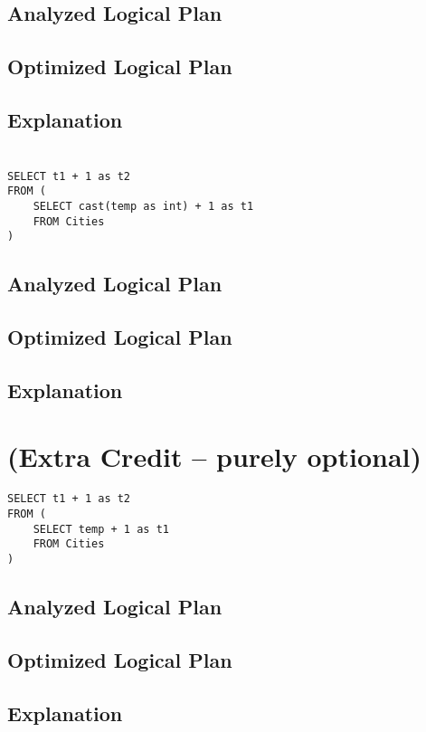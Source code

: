 \documentclass[12pt]{article}
\begin{document}
\subsection*{Analyzed Logical Plan}
\vspace{2in}

\subsection*{Optimized Logical Plan}
\vspace{2in}

\subsection*{Explanation}

\newpage

\section{}
\begin{verbatim}
SELECT t1 + 1 as t2
FROM (
    SELECT cast(temp as int) + 1 as t1
    FROM Cities
)
\end{verbatim}

\subsection*{Analyzed Logical Plan}
\vspace{2in}

\subsection*{Optimized Logical Plan}
\vspace{2in}

\subsection*{Explanation}

\newpage

\section{(Extra Credit -- purely optional)}
\begin{verbatim}
SELECT t1 + 1 as t2
FROM (
    SELECT temp + 1 as t1
    FROM Cities
)
\end{verbatim}

\subsection*{Analyzed Logical Plan}
\vspace{2in}

\subsection*{Optimized Logical Plan}
\vspace{2in}

\subsection*{Explanation}
\end{document}
